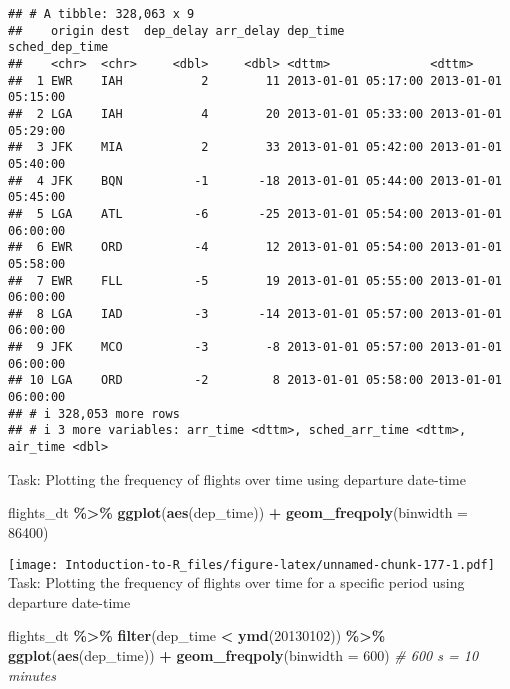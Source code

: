 \documentclass[
]{article}
\newenvironment{Shaded}{\begin{snugshade}}{\end{snugshade}}
\newcommand{\AttributeTok}[1]{\textcolor[rgb]{0.13,0.29,0.53}{#1}}
\newcommand{\CommentTok}[1]{\textcolor[rgb]{0.56,0.35,0.01}{\textit{#1}}}
\newcommand{\DecValTok}[1]{\textcolor[rgb]{0.00,0.00,0.81}{#1}}
\newcommand{\FunctionTok}[1]{\textcolor[rgb]{0.13,0.29,0.53}{\textbf{#1}}}
\newcommand{\NormalTok}[1]{#1}
\newcommand{\SpecialCharTok}[1]{\textcolor[rgb]{0.81,0.36,0.00}{\textbf{#1}}}
\begin{document}
\begin{verbatim}
## # A tibble: 328,063 x 9
##    origin dest  dep_delay arr_delay dep_time            sched_dep_time     
##    <chr>  <chr>     <dbl>     <dbl> <dttm>              <dttm>             
##  1 EWR    IAH           2        11 2013-01-01 05:17:00 2013-01-01 05:15:00
##  2 LGA    IAH           4        20 2013-01-01 05:33:00 2013-01-01 05:29:00
##  3 JFK    MIA           2        33 2013-01-01 05:42:00 2013-01-01 05:40:00
##  4 JFK    BQN          -1       -18 2013-01-01 05:44:00 2013-01-01 05:45:00
##  5 LGA    ATL          -6       -25 2013-01-01 05:54:00 2013-01-01 06:00:00
##  6 EWR    ORD          -4        12 2013-01-01 05:54:00 2013-01-01 05:58:00
##  7 EWR    FLL          -5        19 2013-01-01 05:55:00 2013-01-01 06:00:00
##  8 LGA    IAD          -3       -14 2013-01-01 05:57:00 2013-01-01 06:00:00
##  9 JFK    MCO          -3        -8 2013-01-01 05:57:00 2013-01-01 06:00:00
## 10 LGA    ORD          -2         8 2013-01-01 05:58:00 2013-01-01 06:00:00
## # i 328,053 more rows
## # i 3 more variables: arr_time <dttm>, sched_arr_time <dttm>, air_time <dbl>
\end{verbatim}

Task: Plotting the frequency of flights over time using departure
date-time

\begin{Shaded}
\begin{Highlighting}[]
\NormalTok{flights\_dt }\SpecialCharTok{\%\textgreater{}\%} 
  \FunctionTok{ggplot}\NormalTok{(}\FunctionTok{aes}\NormalTok{(dep\_time)) }\SpecialCharTok{+} 
  \FunctionTok{geom\_freqpoly}\NormalTok{(}\AttributeTok{binwidth =} \DecValTok{86400}\NormalTok{) }
\end{Highlighting}
\end{Shaded}

\texttt{[image: Intoduction-to-R\_files/figure-latex/unnamed-chunk-177-1.pdf]}
Task: Plotting the frequency of flights over time for a specific period
using departure date-time

\begin{Shaded}
\begin{Highlighting}[]
\NormalTok{flights\_dt }\SpecialCharTok{\%\textgreater{}\%} 
  \FunctionTok{filter}\NormalTok{(dep\_time }\SpecialCharTok{\textless{}} \FunctionTok{ymd}\NormalTok{(}\DecValTok{20130102}\NormalTok{)) }\SpecialCharTok{\%\textgreater{}\%} 
  \FunctionTok{ggplot}\NormalTok{(}\FunctionTok{aes}\NormalTok{(dep\_time)) }\SpecialCharTok{+} 
  \FunctionTok{geom\_freqpoly}\NormalTok{(}\AttributeTok{binwidth =} \DecValTok{600}\NormalTok{) }\CommentTok{\# 600 s = 10 minutes}
\end{Highlighting}
\end{Shaded}
\end{document}
